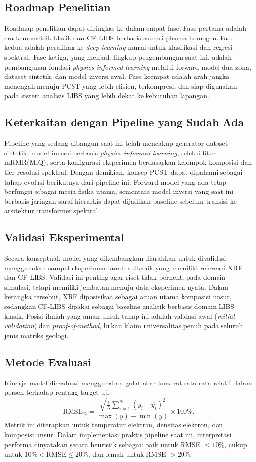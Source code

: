 \subsection{Roadmap Penelitian}
Roadmap penelitian dapat diringkas ke dalam empat fase. Fase pertama adalah era kemometrik klasik dan CF-LIBS berbasis asumsi plasma homogen. Fase kedua adalah peralihan ke \textit{deep learning} murni untuk klasifikasi dan regresi spektral. Fase ketiga, yang menjadi lingkup pengembangan saat ini, adalah pembangunan fondasi \textit{physics-informed learning} melalui forward model dua-zona, dataset sintetik, dan model inversi awal. Fase keempat adalah arah jangka menengah menuju PCST yang lebih efisien, terkompresi, dan siap digunakan pada sistem analisis LIBS yang lebih dekat ke kebutuhan lapangan.

\subsection{Keterkaitan dengan Pipeline yang Sudah Ada}
Pipeline yang sedang dibangun saat ini telah mencakup generator dataset sintetik, model inversi berbasis \textit{physics-informed learning}, seleksi fitur mRMR(MIQ), serta konfigurasi eksperimen berdasarkan kelompok komposisi dan tier resolusi spektral. Dengan demikian, konsep PCST dapat dipahami sebagai tahap evolusi berikutnya dari pipeline ini. Forward model yang ada tetap berfungsi sebagai mesin fisika utama, sementara model inversi yang saat ini berbasis jaringan saraf hierarkis dapat dijadikan baseline sebelum transisi ke arsitektur transformer spektral.

\subsection{Validasi Eksperimental}
Secara konseptual, model yang dikembangkan diarahkan untuk divalidasi menggunakan sampel eksperimen tanah vulkanik yang memiliki referensi XRF dan CF-LIBS. Validasi ini penting agar riset tidak berhenti pada domain simulasi, tetapi memiliki jembatan menuju data eksperimen nyata. Dalam kerangka tersebut, XRF diposisikan sebagai acuan utama komposisi unsur, sedangkan CF-LIBS dipakai sebagai baseline analitik berbasis domain LIBS klasik. Posisi ilmiah yang aman untuk tahap ini adalah validasi awal (\textit{initial validation}) dan \textit{proof-of-method}, bukan klaim universalitas penuh pada seluruh jenis matriks geologi.

\subsection{Metode Evaluasi}
Kinerja model dievaluasi menggunakan galat akar kuadrat rata-rata relatif dalam persen terhadap rentang target uji:
\begin{equation}
\mathrm{RMSE}_{\%}
=
\frac{
\sqrt{\frac{1}{N}\sum_{i=1}^{N}(y_i-\hat{y}_i)^2}
}
{\max(y)-\min(y)}
\times 100\%.
\end{equation}
Metrik ini diterapkan untuk temperatur elektron, densitas elektron, dan komposisi unsur. Dalam implementasi praktis pipeline saat ini, interpretasi performa dinyatakan secara heuristik sebagai: baik untuk RMSE $\le 10\%$, cukup untuk $10\% < \mathrm{RMSE} \le 20\%$, dan lemah untuk RMSE $>20\%$.

